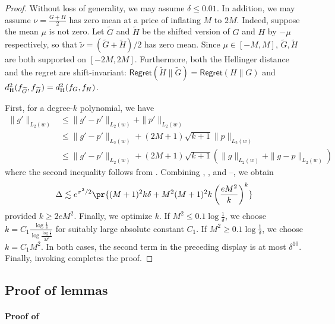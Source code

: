 \documentclass[letterpaper,11pt]{article}
\newcommand{\hellinger}{d_{\rm H}}
\newcommand{\pth}[1]{\left( #1 \right)}
\theoremstyle{definition}
\newcommand{\Regret}{\mathsf{Regret}}
\renewcommand{\tilde}{\widetilde}
\begin{document}
\begin{proof}
      Without loss of generality, we may assume $\delta \leq 0.01$.
      In addition, we may assume $\nu=\frac{G+H}{2}$ has zero mean at a price of inflating
      $M$ to $2M$. Indeed, suppose the mean $\mu$ is not zero. Let $\tilde G$ and $\tilde
      H$ be the shifted version of $G$ and $H$ by $-\mu$ respectively, so that $\tilde
      \nu=(\tilde G+\tilde H)/2$ has zero mean.
      Since $\mu \in [-M,M]$,
      $\tilde G,\tilde H$ are both supported on $[-2M,2M]$. Furthermore,
      both the Hellinger distance and the regret are  shift-invariant:
      $\Regret(\tilde H\|\tilde G)= \Regret(H\|G)$ and
      $\hellinger^2(f_{\tilde G},f_{\tilde H}) = \hellinger^2(f_G,f_H)$.

      First, for a degree-$k$ polynomial,  we have
      \begin{align*}
        \|g'\|_{L_2(w)}
        &\leq
        \|g'-p'\|_{L_2(w)} +
        \|p'\|_{L_2(w)}\\
        &\leq
        \|g'-p'\|_{L_2(w)}+
        (2M+1)\sqrt{k+1} \|p\|_{L_2(w)}\\
        &\leq \|g'-p'\|_{L_2(w)}+
        (2M+1)\sqrt{k+1} (\|g\|_{L_2(w)}
        + \|g-p\|_{L_2(w)})
      \end{align*}
      where the second inequality follows from  .
      Combining , , and  
      --, we obtain
      \[
        \Delta
        \lesssim e^{\sigma^2/2}\pr{
        (M+1)^2 k    \delta+
        M^2 (M+1)^2 k \pth{\frac{eM^2}{k}}^{k}}
      \]
      provided $k\geq 2eM^2$.
      Finally, we optimize $k$.
      If $M^2 \leq 0.1 \log \frac{1}{\delta}$, we choose $k = C_1 \frac{\log \frac{1}{\delta}}{\log \frac{\log \frac{1}{\delta}}{M^2}}$
      for suitably large absolute constant $C_1$.
      If $M^2 \geq 0.1 \log \frac{1}{\delta}$, we choose $k = C_1 M^2$. In both cases, the
      second term in the preceding display is at most $\delta^{10}$. Finally, invoking  completes the proof.
    \end{proof}


\subsection{Proof of lemmas}

    \paragraph{Proof of }
\end{document}
